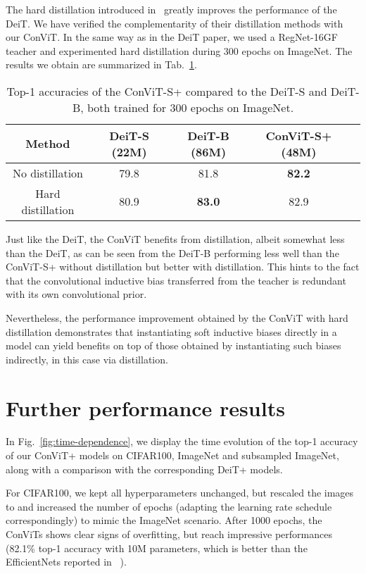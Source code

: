\documentclass[a4paper,11pt,twocolumn]{article}
\newcommand{\citet}[1]{\textcite{#1}}
\begin{document}
The hard distillation introduced in~\citet{touvron2020training} greatly improves the performance of the DeiT. We have verified the complementarity of their distillation methods with our ConViT. In the same way as in the DeiT paper, we used a RegNet-16GF teacher and experimented hard distillation during 300 epochs on ImageNet. The results we obtain are summarized in Tab.~\ref{tab:distillation}.

\begin{table}[h]
    \centering
    \begin{tabular}{c|cccc}
    \toprule
    Method & DeiT-S (22M) & DeiT-B (86M) & ConViT-S+ (48M)\\
    \midrule
    No distillation &  79.8 & 81.8 &\textbf{82.2}\\
    Hard distillation  & 80.9 & \textbf{83.0} & 82.9\\ 
    \bottomrule
    \end{tabular}
    \caption{Top-1 accuracies of the ConViT-S+ compared to the DeiT-S and DeiT-B, both trained for 300 epochs on ImageNet.}
    \label{tab:distillation}
\end{table}
Just like the DeiT, the ConViT benefits from distillation, albeit somewhat less than the DeiT, as can be seen from the DeiT-B performing less well than the ConViT-S+ without distillation but better with distillation. This hints to the fact that the convolutional inductive bias transferred from the teacher is redundant with its own convolutional prior.

Nevertheless, the performance improvement obtained by the ConViT with hard distillation demonstrates that instantiating soft inductive biases directly in a model can yield benefits on top of those obtained by instantiating such biases indirectly, in this case via distillation.

\section{Further performance results}
\label{app:performance}

In Fig.~\ref{fig:time-dependence}, we display the time evolution of the top-1 accuracy of our ConViT+ models on CIFAR100, ImageNet and subsampled ImageNet, along with a comparison with the corresponding DeiT+ models. 

For CIFAR100, we kept all hyperparameters unchanged, but rescaled the images to  and increased the number of epochs (adapting the learning rate schedule correspondingly) to mimic the ImageNet scenario. After 1000 epochs, the ConViTs shows clear signs of overfitting, but reach impressive performances (82.1\% top-1 accuracy with 10M parameters, which is better than the EfficientNets reported in ~\cite{zhao2020splitnet}).
\end{document}
